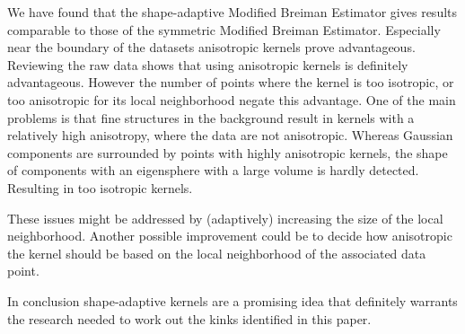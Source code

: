 
We have found that the shape-adaptive Modified Breiman Estimator gives results comparable to those of the symmetric Modified Breiman Estimator. Especially near the boundary of the datasets anisotropic kernels prove advantageous. Reviewing the raw data shows that using anisotropic kernels is definitely advantageous. However the number of points where the kernel is too isotropic, or too anisotropic for its local neighborhood negate this advantage. 
One of the main problems is that fine structures in the background result in kernels with a relatively high anisotropy, where the data are not anisotropic.
Whereas Gaussian components are surrounded by points with highly anisotropic kernels, the shape of components with an eigensphere with a large volume is hardly detected. Resulting in too isotropic kernels. 

These issues might be addressed by (adaptively) increasing the size of the local neighborhood. Another possible improvement could be to decide how anisotropic the kernel should be based on the local neighborhood of the associated data point.

In conclusion shape-adaptive kernels are a promising idea that definitely warrants the research needed to work out the kinks identified in this paper.